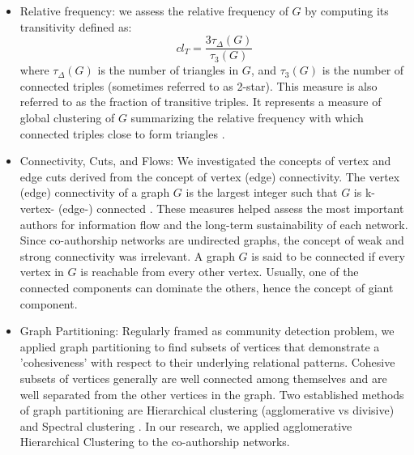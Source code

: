\begin{itemize}
\item Relative frequency: we assess the relative frequency of $G$ by computing its transitivity defined as: 
\begin{equation} 
cl_T = \frac{3\tau_\Delta (G)}{\tau_3 (G)} 
\end{equation}
where $\tau_\Delta (G)$ is the number of triangles in $G$, and $\tau_3 (G)$ is the number of connected triples (sometimes referred to as 2-star). This measure is also referred to as the fraction of transitive triples. It represents a measure of global clustering of $G$ summarizing the relative frequency with which connected triples close to form triangles \cite{kolaczyk_statistical_2014}.
\item Connectivity, Cuts, and Flows: We investigated the concepts of vertex and edge cuts derived from the concept of vertex (edge) connectivity. The vertex (edge) connectivity of a graph $G$ is the largest integer such that $G$ is k-vertex- (edge-) connected \cite{kolaczyk_statistical_2014}. These measures helped assess the most important authors for information flow and the long-term sustainability of each network. Since co-authorship networks are undirected graphs, the concept of weak and strong connectivity was irrelevant. A graph $G$ is said to be connected if every vertex in $G$ is reachable from every other vertex. Usually, one of the connected components can dominate the others, hence the concept of giant component.
\item Graph Partitioning: Regularly framed as community detection problem, we applied graph partitioning to find subsets of vertices that demonstrate a 'cohesiveness' with respect to their underlying relational patterns. Cohesive subsets of vertices generally are well connected among themselves and are well separated from the other vertices in the graph. Two established methods of graph partitioning are Hierarchical clustering (agglomerative vs divisive) and Spectral clustering \cite{kolaczyk_statistical_2014}. In our research, we applied agglomerative Hierarchical Clustering to the co-authorship networks.
\end{itemize}

